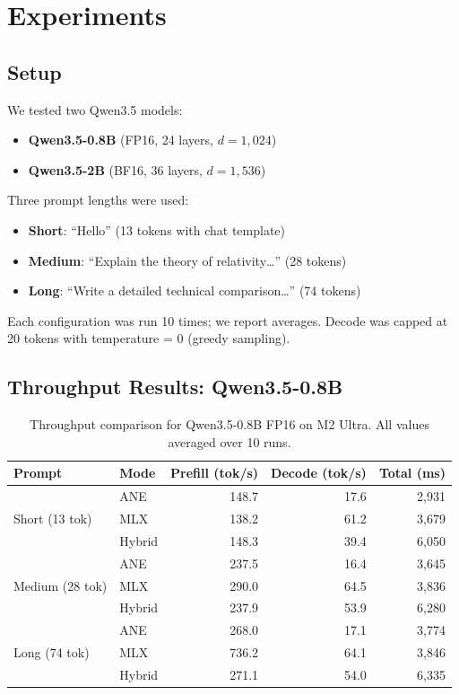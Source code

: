 \documentclass[11pt]{article}
\begin{document}
\section{Experiments}
\label{sec:experiments}

\subsection{Setup}

We tested two Qwen3.5 models:
\begin{itemize}[nosep]
  \item \textbf{Qwen3.5-0.8B} (FP16, 24 layers, $d=1{,}024$)
  \item \textbf{Qwen3.5-2B} (BF16, 36 layers, $d=1{,}536$)
\end{itemize}

Three prompt lengths were used:
\begin{itemize}[nosep]
  \item \textbf{Short}: ``Hello'' (13 tokens with chat template)
  \item \textbf{Medium}: ``Explain the theory of relativity\ldots'' (28 tokens)
  \item \textbf{Long}: ``Write a detailed technical comparison\ldots'' (74 tokens)
\end{itemize}

Each configuration was run 10 times; we report averages. Decode was capped
at 20 tokens with temperature = 0 (greedy sampling).

\subsection{Throughput Results: Qwen3.5-0.8B}

\begin{table}[h]
\centering
\caption{Throughput comparison for Qwen3.5-0.8B FP16 on M2 Ultra.
  All values averaged over 10 runs.}
\label{tab:results-08b}
\begin{tabular}{llrrr}
\toprule
Prompt & Mode & Prefill (tok/s) & Decode (tok/s) & Total (ms) \\
\midrule
\multirow{3}{*}{Short (13 tok)}
  & ANE      & 148.7 & 17.6 & 2{,}931 \\
  & MLX      & 138.2 & 61.2 & 3{,}679 \\
  & Hybrid   & 148.3 & 39.4 & 6{,}050 \\
\midrule
\multirow{3}{*}{Medium (28 tok)}
  & ANE      & 237.5 & 16.4 & 3{,}645 \\
  & MLX      & 290.0 & 64.5 & 3{,}836 \\
  & Hybrid   & 237.9 & 53.9 & 6{,}280 \\
\midrule
\multirow{3}{*}{Long (74 tok)}
  & ANE      & 268.0 & 17.1 & 3{,}774 \\
  & MLX      & 736.2 & 64.1 & 3{,}846 \\
  & Hybrid   & 271.1 & 54.0 & 6{,}335 \\
\bottomrule
\end{tabular}
\end{table}
\end{document}
